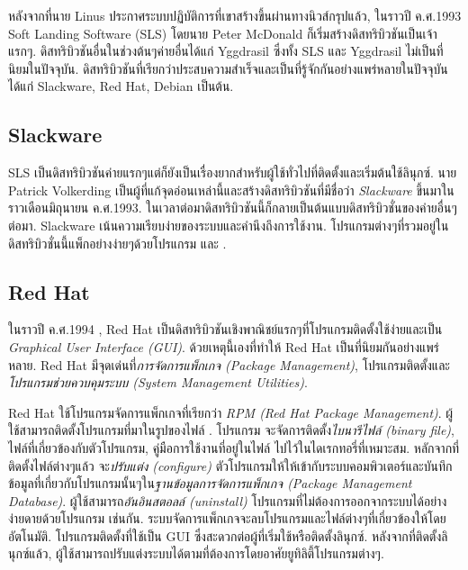 \begin{thwbr}
{หลังจากที่นาย Linus ประกาศระบบปฏิบัติการที่เขาสร้างขึ้นผ่านทางนิวส์กรุปแล้ว, ในราวปี ค.ศ.1993 Soft Landing Software (SLS) โดยนาย Peter McDonald ก็เริ่มสร้างดิสทริบิวชันเป็นเจ้าแรกๆ. ดิสทริบิวชันอื่นในช่วงต้นๆค่ายอื่นได้แก่ Yggdrasil ซึ่งทั้ง SLS และ Yggdrasil ไม่เป็นที่นิยมในปัจจุบัน. ดิสทริบิวชันที่เรียกว่าประสบความสำเร็จและเป็นที่รู้จักกันอย่างแพร่หลายในปัจจุบันได้แก่ Slackware, Red Hat, Debian เป็นต้น.


\subsection{{\latintext Slackware}}%

SLS เป็นดิสทริบิวชันค่ายแรกๆแต่ก็ยังเป็นเรื่องยากสำหรับผู้ใช้ทั่วไปที่ติดตั้งและเริ่มต้นใช้ลินุกซ์. นาย Patrick Volkerding เป็นผู้ที่แก้จุดอ่อนเหล่านี้และสร้างดิสทริบิวชันที่มีชื่อว่า {\em Slackware} ขึ้นมาในราวเดือนมิถุนายน ค.ศ.1993. ในเวลาต่อมาดิสทริบิวชันนี้ก็กลายเป็นต้นแบบดิสทริบิวชั่นของค่ายอื่นๆต่อมา. Slackware เน้นความเรียบง่ายของระบบและคำนึงถึงการใช้งาน. โปรแกรมต่างๆที่รวมอยู่ในดิสทริบิวชั่นนี้แพ็กอย่างง่ายๆด้วยโปรแกรม  และ .


\subsection{{\latintext Red Hat}}%

ในราวปี ค.ศ.1994 \cite{redhathist}, Red Hat เป็นดิสทริบิวชันเชิงพาณิชย์แรกๆที่โปรแกรมติดตั้งใช้ง่ายและเป็น {\em Graphical User Interface (GUI)}. ด้วยเหตุนี้เองที่ทำให้ Red Hat เป็นที่นิยมกันอย่างแพร่หลาย. Red Hat มีจุดเด่นที่{\em การจัดการแพ็กเกจ (Package Management)}, โปรแกรมติดตั้งและ{\em โปรแกรมช่วยควบคุมระบบ (System Management Utilities)}. 

Red Hat ใช้โปรแกรมจัดการแพ็กเกจที่เรียกว่า {\em RPM (Red Hat Package Management)}. ผู้ใช้สามารถติดตั้งโปรแกรมที่มาในรูปของไฟล์ . โปรแกรม {\latintext{}} จะจัดการติดตั้ง{\em ไบนารีไฟล์ (binary file)}, ไฟล์ที่เกี่ยวข้องกับตัวโปรแกรม, คู่มือการใช้งานที่อยู่ในไฟล์ {\latintext{}} ไปไว้ในไดเรกทอรี่ที่เหมาะสม. หลักจากที่ติดตั้งไฟล์ต่างๆแล้ว {\latintext{}} จะ{\em ปรับแต่ง (configure)} ตัวโปรแกรมให้ให้เข้ากับระบบคอมพิวเตอร์และบันทึกข้อมูลที่เกี่ยวกับโปรแกรมนั้นๆใน{\em ฐานข้อมูลการจัดการแพ็กเกจ (Package Management Database)}. ผู้ใช้สามารถ{\em อันอินสตอลล์ (uninstall)} โปรแกรมที่ไม่ต้องการออกจากระบบได้อย่างง่ายดายด้วยโปรแกรม {\latintext{}} เช่นกัน. ระบบจัดการแพ็กเกจจะลบโปรแกรมและไฟล์ต่างๆที่เกี่ยวข้องให้โดยอัตโนมัติ.
โปรแกรมติดตั้งที่ใช้เป็น GUI ซึ่งสะดวกต่อผู้ที่เริ่มใช้หรือติดตั้งลินุกซ์. หลังจากที่ติดตั้งลินุกซ์แล้ว, ผู้ใช้สามารถปรับแต่งระบบได้ตามที่ต้องการโดยอาศัยยูทิลิตี้โปรแกรมต่างๆ.

}
\end{thwbr}
